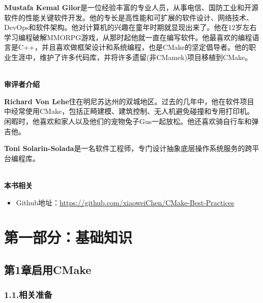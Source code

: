 \documentclass[11pt,a4paper,UTF8]{book}
\begin{document}
\begin{sloppypar}
	\textbf{Mustafa Kemal Gilor}是一位经验丰富的专业人员，从事电信、国防工业和开源软件的性能关键软件开发。他的专长是高性能和可扩展的软件设计、网络技术、DevOps和软件架构。他对计算机的兴趣在童年时期就显现出来了。他在12岁左右学习编程破解MMORPG游戏，从那时起他就一直在编写软件。他最喜欢的编程语言是C++，并且喜欢做框架设计和系统编程，也是CMake的坚定倡导者。他的职业生涯中，维护了许多代码库，并将许多遗留(非CMamek)项目移植到CMake。
	
	\hspace*{\fill} \\ %
	\noindent\textbf{审评者介绍}
	
	\textbf{Richard Von Lehe}住在明尼苏达州的双城地区。过去的几年中，他在软件项目中经常使用CMake，包括正畸建模、建筑控制、无人机避免碰撞和专用打印机。闲暇时，他喜欢和家人以及他们的宠物兔子Gus一起放松。他还喜欢骑自行车和弹吉他。
	
	\textbf{Toni Solarin-Solada}是一名软件工程师，专门设计抽象底层操作系统服务的跨平台编程库。
	
	
	\hspace*{\fill} \\ %
	\noindent\textbf{本书相关}
	\begin{itemize}
	\item Github地址：\url{https://github.com/xiaoweiChen/CMake-Best-Practices}
	\end{itemize}
	\newpage
	
	\pagestyle{empty}
	
	\newpage
	
	\tableofcontents
	\newpage

	
	\color{white}
	\section*{第一部分：基础知识}
	\pagecolor{mygray}
	\textbf{}
	\newpage
	\color{black}
	\pagecolor{white}

	\subsection*{ 第1章\hspace{0.5cm}启用CMake}
	
	
	\subsubsection*{ 1.1.\hspace{0.2cm}相关准备}
	
	

\end{sloppypar}
\end{document}
